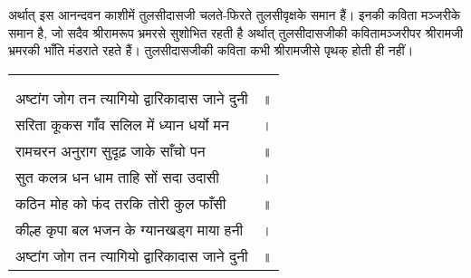 \begin{sloppypar}\justifying{}
अर्थात् इस आनन्दवन काशीमें तुलसीदासजी चलते-फिरते तुलसीवृक्षके समान हैं। इनकी कविता मञ्जरीके समान है, जो सदैव श्रीरामरूप भ्रमरसे सुशोभित रहती है अर्थात् तुलसीदासजीकी कवितामञ्जरीपर श्रीरामजी भ्रमरकी भाँति मंडराते रहते हैं। तुलसीदासजीकी कविता कभी श्रीरामजीसे पृथक् होती ही नहीं।
\end{sloppypar}


{
{\bfseries
\setlength{\mylenone}{0pt}
\settowidth{\mylentwo}{}
\setlength{\mylenone}{\maxof{\mylenone}{\mylentwo}}
\settowidth{\mylentwo}{अष्टांग जोग तन त्यागियो द्वारिकादास जाने दुनी}
\setlength{\mylenone}{\maxof{\mylenone}{\mylentwo}}
\settowidth{\mylentwo}{सरिता कूकस गाँव सलिल में ध्यान धर्यो मन}
\setlength{\mylenone}{\maxof{\mylenone}{\mylentwo}}
\settowidth{\mylentwo}{रामचरन अनुराग सुदृढ़ जाके साँचो पन}
\setlength{\mylenone}{\maxof{\mylenone}{\mylentwo}}
\settowidth{\mylentwo}{सुत कलत्र धन धाम ताहि सों सदा उदासी}
\setlength{\mylenone}{\maxof{\mylenone}{\mylentwo}}
\settowidth{\mylentwo}{कठिन मोह को फंद तरकि तोरी कुल फाँसी}
\setlength{\mylenone}{\maxof{\mylenone}{\mylentwo}}
\settowidth{\mylentwo}{कील्ह कृपा बल भजन के ग्यानखड्ग माया हनी}
\setlength{\mylenone}{\maxof{\mylenone}{\mylentwo}}
\settowidth{\mylentwo}{अष्टांग जोग तन त्यागियो द्वारिकादास जाने दुनी}
\setlength{\mylenone}{\maxof{\mylenone}{\mylentwo}}
\setlength{\mylentwo}{\baselineskip}
\setlength{\mylenone}{\mylenone + 1pt}
\begin{longtable}[l]{@{\hspace*{\mylen}}>{\setlength\parfillskip{0pt}}p{\mylenone}@{}@{}l@{}}
 & \\[-\the\mylentwo]
\centering{॥ १८२ \hspace*{-1.5mm}॥} & \\ \nopagebreak
अष्टांग जोग तन त्यागियो द्वारिकादास जाने दुनी & ॥\\
सरिता कूकस गाँव सलिल में ध्यान धर्यो मन & ।\\ \nopagebreak
रामचरन अनुराग सुदृढ़ जाके साँचो पन & ॥\\
सुत कलत्र धन धाम ताहि सों सदा उदासी & ।\\ \nopagebreak
कठिन मोह को फंद तरकि तोरी कुल फाँसी & ॥\\
कील्ह कृपा बल भजन के ग्यानखड्ग माया हनी & ।\\ \nopagebreak
अष्टांग जोग तन त्यागियो द्वारिकादास जाने दुनी & ॥
\end{longtable}
}
}

